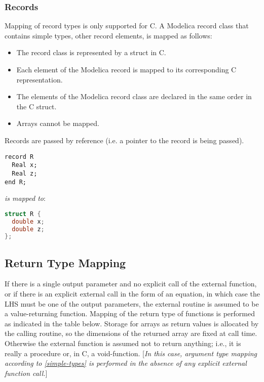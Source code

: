 \subsubsection{Records}

Mapping of record types is only supported for C. A Modelica record class
that contains simple types, other record elements, is mapped as follows:

\begin{itemize}
\item
  The record class is represented by a struct in C.
\item
  Each element of the Modelica record is mapped to its corresponding C
  representation.
\item
  The elements of the Modelica record class are declared in the same
  order in the C struct.
\item
  Arrays cannot be mapped.
\end{itemize}

Records are passed by reference (i.e. a pointer to the record is being
passed).

\begin{example}
\begin{lstlisting}[language=modelica]
record R
  Real x;
  Real z;
end R;
\end{lstlisting}
\emph{is mapped to}:
\begin{lstlisting}[language=C]
struct R {
  double x;
  double z;
};
\end{lstlisting}
\end{example}

\subsection{Return Type Mapping}

If there is a single output parameter and no explicit call of the
external function, or if there is an explicit external call in the form
of an equation, in which case the LHS must be one of the output
parameters, the external routine is assumed to be a value-returning
function. Mapping of the return type of functions is performed as
indicated in the table below. Storage for arrays as return values is
allocated by the calling routine, so the dimensions of the returned
array are fixed at call time. Otherwise the external function is assumed
not to return anything; i.e., it is really a procedure or, in C, a
void-function. {[}\emph{In this case, argument type mapping according to
\autoref{simple-types} is performed in the absence of any explicit
external function call.}{]}

